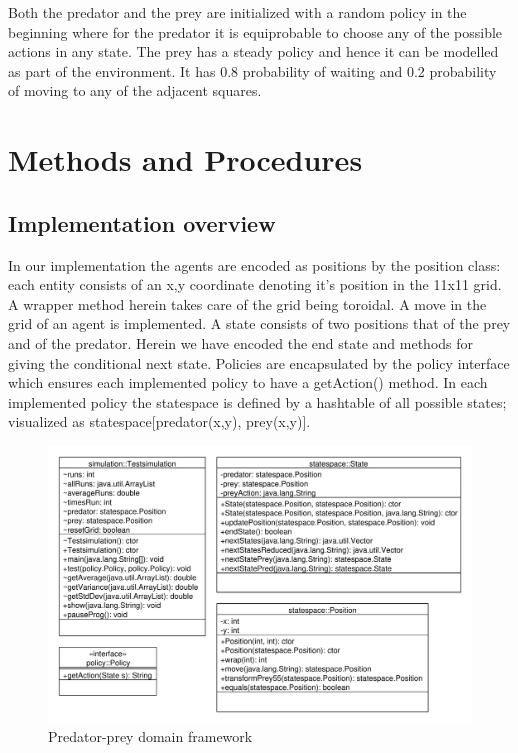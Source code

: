 \documentclass[paper=a4, fontsize=11pt]{scrartcl}
\numberwithin{equation}{section}		%
\numberwithin{figure}{section}			%
\numberwithin{table}{section}				%
\begin{document}
Both the predator and the prey are initialized with a random policy in the beginning where for the predator it is equiprobable to choose any of the possible actions %
in any state. The prey has a steady policy and hence it can be modelled as part of the environment. It has 0.8 probability of waiting and 0.2 probability of moving to any of the adjacent squares.

\section{Methods and Procedures}
\label{methods}
\subsection{Implementation overview}
In our implementation the agents are encoded as positions by the position class: each entity consists of an x,y coordinate denoting it's position in the 11x11 grid. A wrapper method herein takes care of the grid being toroidal. A move in the grid of an agent is implemented. A state consists of two positions that of the prey and of the predator. Herein we have encoded the end state and methods for giving the conditional next state. Policies are encapsulated by the policy interface which ensures each implemented policy to have a getAction() method. In each implemented policy the statespace is defined by a hashtable of all possible states; visualized as statespace[predator(x,y), prey(x,y)].
\begin{figure}[H] \centering
\includegraphics[scale=0.6]{uml_general.pdf}
\caption{Predator-prey domain framework} \label{Predator-prey domain framework}
\end{figure}
\end{document}
